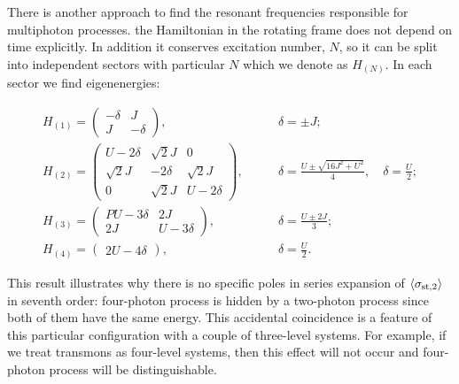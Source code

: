 \documentclass[%
 aps, pra,
 amsmath,amssymb,
 preprint,%
superscriptaddress
]{revtex4-2}
\begin{document}
There is another approach to find the resonant frequencies responsible for multiphoton processes. 
the Hamiltonian in the rotating frame does not depend on time explicitly. In addition it conserves excitation number, $N$, so it can be split into independent sectors with particular $N$ which we denote as $H_{(N)}$.
In each sector we find eigenenergies:
\begin{widetext}
$$
\begin{array}{ccc}
H_{(1)} = \begin{pmatrix}
-\delta & J
\\
J & -\delta
\end{pmatrix},
\qquad &
\delta = \pm J;
\\[1em]
H_{(2)} = \begin{pmatrix}
U - 2\delta & \sqrt{2} J & 0
\\
\sqrt{2} J & - 2\delta & \sqrt{2} J
\\
0 & \sqrt{2} J & U - 2 \delta
\end{pmatrix},
\qquad &
\displaystyle
\delta = \frac{U \pm \sqrt{16 J^2 + U^2}}{4}, \quad \delta = \frac{U}{2};
\\[2em]
H_{(3)} = \begin{pmatrix}P
U - 3\delta & 2J
\\
2 J & U - 3 \delta
\end{pmatrix},
\qquad & \displaystyle
\delta = \frac{U \pm 2 J}{3};
\\[2em]
H_{(4)} = \begin{pmatrix}
2 U - 4\delta
\end{pmatrix},
\qquad & \displaystyle
\delta = \frac{U}{2}.
\end{array}
$$
\end{widetext}
This result illustrates why there is no specific poles in series expansion of $\langle\sigma_{{\rm st},2}\rangle$ in seventh order: four-photon process is hidden by a two-photon process since both of them have the same energy. This accidental coincidence is a feature of this particular configuration with a couple of three-level systems. For example, if we treat transmons as  four-level systems, then this effect will not occur and four-photon process will be distinguishable.
\end{document}
